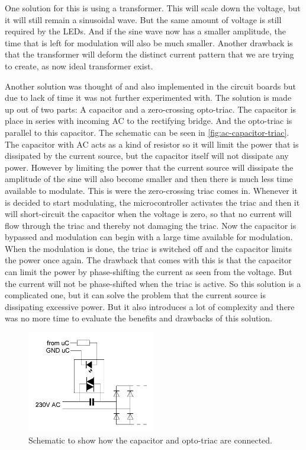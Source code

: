 	One solution for this is using a transformer.
	This will scale down the voltage, but it will still remain a sinusoidal wave.
	But the same amount of voltage is still required by the LEDs.
	And if the sine wave now has a smaller amplitude, the time that is left for modulation will also be much smaller.
	Another drawback is that the transformer will deform the distinct current pattern that we are trying to create, as now ideal transformer exist.

	Another solution was thought of and also implemented in the circuit boards but due to lack of time it was not further experimented with.
	The solution is made up out of two parts: A capacitor and a zero-crossing opto-triac.
	The capacitor is place in series with incoming AC to the rectifying bridge.
	And the opto-triac is parallel to this capacitor.
	The schematic can be seen in \autoref{fig:ac-capacitor-triac}.
	The capacitor with AC acts as a kind of resistor so it will limit the power that is dissipated by the current source, but the capacitor itself will not dissipate any power.
	However by limiting the power that the current source will dissipate the amplitude of the sine will also become smaller and then there is much less time available to modulate.
	This is were the zero-crossing triac comes in.
	Whenever it is decided to start modulating, the microcontroller activates the triac and then it will short-circuit the capacitor when the voltage is zero, so that no current will flow through the triac and thereby not damaging the triac.
	Now the capacitor is bypassed and modulation can begin with a large time available for modulation.
	When the modulation is done, the triac is switched off and the capacitor limits the power once again.
	The drawback that comes with this is that the capacitor can limit the power by phase-shifting the current as seen from the voltage.
	But the current will not be phase-shifted when the triac is active.
	So this solution is a complicated one, but it can solve the problem that the current source is dissipating excessive power.
	But it also introduces a lot of complexity and there was no more time to evaluate the benefits and drawbacks of this solution.




	\begin{figure}
		\centering
		\includegraphics[angle=0,width=0.5\textwidth]{chapters/hardware-chapters/ac-capacitor-triac.JPG}
		\caption{Schematic to show how the capacitor and opto-triac are connected.}
		\label{fig:ac-capacitor-triac}
	\end{figure}


